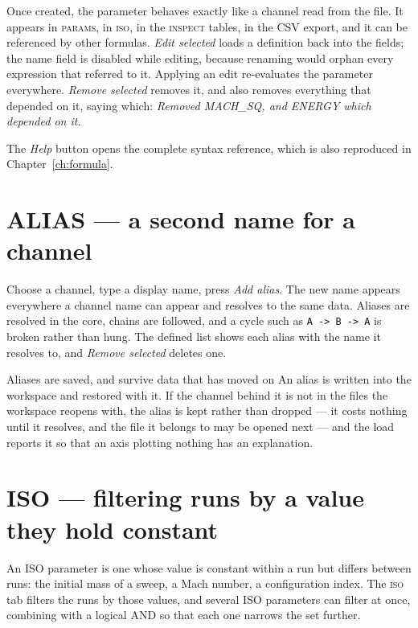 \documentclass[11pt,a4paper,oneside]{report}
\newcommand{\code}[1]{\texttt{#1}}
\newcommand{\tab}[1]{\textsc{#1}}
\begin{document}
Once created, the parameter behaves exactly like a channel read from the file.
It appears in \tab{params}, in \tab{iso}, in the \tab{inspect} tables, in the CSV
export, and it can be referenced by other formulas. \emph{Edit selected} loads a
definition back into the fields; the name field is disabled while editing,
because renaming would orphan every expression that referred to it. Applying an
edit re-evaluates the parameter everywhere. \emph{Remove selected} removes it,
and also removes everything that depended on it, saying which: \emph{Removed
MACH\_SQ, and ENERGY which depended on it}.

The \emph{Help} button opens the complete syntax reference, which is also
reproduced in Chapter~\ref{ch:formula}.

\section{ALIAS --- a second name for a channel}

Choose a channel, type a display name, press \emph{Add alias}. The new name
appears everywhere a channel name can appear and resolves to the same data.
Aliases are resolved in the core, chains are followed, and a cycle such as
\code{A -> B -> A} is broken rather than hung. The defined list shows each alias
with the name it resolves to, and \emph{Remove selected} deletes one.

\begin{aoenote}{Aliases are saved, and survive data that has moved on}
An alias is written into the workspace and restored with it. If the channel
behind it is not in the files the workspace reopens with, the alias is kept
rather than dropped --- it costs nothing until it resolves, and the file it
belongs to may be opened next --- and the load reports it so that an axis
plotting nothing has an explanation.
\end{aoenote}

\section{ISO --- filtering runs by a value they hold constant}
\label{sec:iso}

An ISO parameter is one whose value is constant within a run but differs between
runs: the initial mass of a sweep, a Mach number, a configuration index. The
\tab{iso} tab filters the runs by those values, and several ISO parameters can
filter at once, combining with a logical AND so that each one narrows the set
further.
\end{document}

